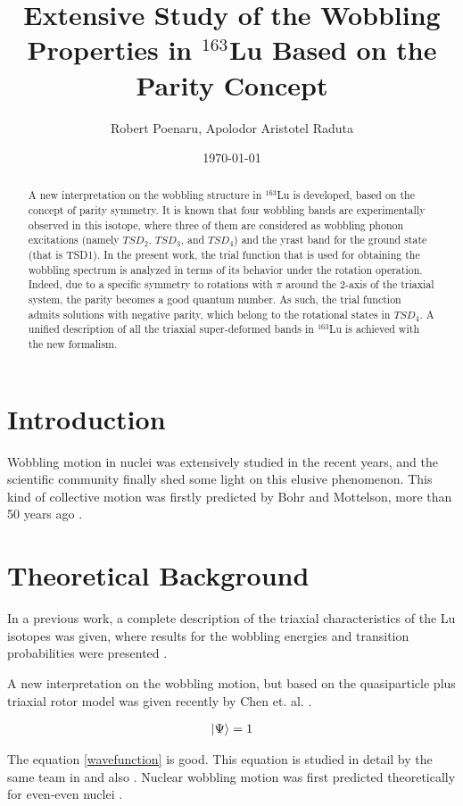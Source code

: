 \documentclass[12pt, oneside]{article}   	%
\title{Extensive Study of the Wobbling Properties in $^{163}$Lu Based on the Parity Concept}
\author{Robert Poenaru, Apolodor Aristotel Raduta}
\date{\today}							%
\begin{document}

\maketitle

\begin{abstract}
A new interpretation on the wobbling structure in $^{163}$Lu is developed, based on the concept of parity symmetry. It is known that four wobbling bands are experimentally observed in this isotope, where three of them are considered as wobbling phonon excitations (namely $TSD_2$, $TSD_3$, and $TSD_4$) and the yrast band for the ground state (that is TSD1). In the present work, the trial function that is used for obtaining the wobbling spectrum is analyzed in terms of its behavior under the rotation operation. Indeed, due to a specific symmetry to rotations with $\pi$ around the 2-axis of the triaxial system, the parity becomes a good quantum number. As such, the trial function admits solutions with negative parity, which belong to the rotational states in $TSD_4$. A unified description of all the triaxial super-deformed bands in $^{163}$Lu is achieved with the new formalism.
\end{abstract}

\section{Introduction}
Wobbling motion in nuclei was extensively studied in the recent years, and the scientific community finally shed some light on this elusive phenomenon. This kind of collective motion was firstly predicted by Bohr and Mottelson, more than 50 years ago \cite{bohr1998nuclear}.

\section{Theoretical Background}

In a previous work, a complete description of the triaxial characteristics of the Lu isotopes was given, where results for the wobbling energies and transition probabilities were presented \cite{raduta2018wobbling}.

A new interpretation on the wobbling motion, but based on the quasiparticle plus triaxial rotor model was given recently by Chen et. al. \cite{chen2020interpretation}.

\begin{align}
    \ket{\Psi}=1
    \label{wavefunction}
\end{align}

The equation \ref{wavefunction} is good. This equation is studied in detail by the same team in \cite{raduta2018wobbling} and also \cite{raduta2020new}.
Nuclear wobbling motion was first predicted theoretically for even-even nuclei \cite{bohr1998nuclear}.


\end{document}
